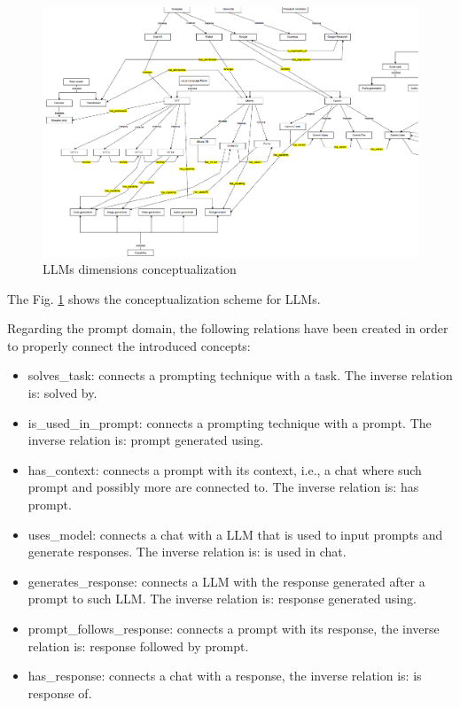\begin{figure}[H]
    \centering
    \includegraphics[width=0.9\linewidth]{Figures/fig_26.png}
    \caption{LLMs dimensions conceptualization}
    \label{fig:26}
\end{figure}
The Fig. \ref{fig:26} shows the conceptualization scheme for LLMs.

Regarding the prompt domain, the following relations have been created in order to properly connect the introduced concepts:

\begin{itemize}
    \item solves\_task: connects a prompting technique with a task. The inverse relation is: solved by.

    \item is\_used\_in\_prompt: connects a prompting technique with a prompt. The inverse relation is: prompt generated using.

    \item has\_context: connects a prompt with its context, i.e., a chat where such prompt and possibly more are connected to. The inverse relation is: has prompt.

    \item uses\_model: connects a chat with a LLM that is used to input prompts and generate responses. The inverse relation is: is used in chat.

    \item generates\_response: connects a LLM with the response generated after a prompt to such LLM. The inverse relation is: response generated using.

    \item prompt\_follows\_response: connects a prompt with its response, the inverse relation is: response followed by prompt.

    \item has\_response: connects a chat with a response, the inverse relation is: is response of.
\end{itemize}

